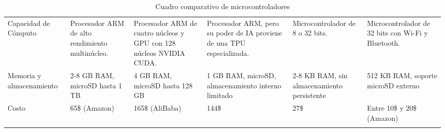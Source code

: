 {\begin{longtable}[c]{p{2.2cm} p{2.4cm} p{2.4cm} p{2.4cm} p{2.4cm} p{2.4cm}}
    Capacidad de Cómputo                                                                                                                                   &
    Procesador ARM de alto rendimiento multinúcleo.                                                                                                        &
    Procesador ARM de cuatro núcleos y GPU con 128 núcleos NVIDIA CUDA.                                                                                    &
    Procesador ARM, pero su poder de IA proviene de una TPU especializada.                                                                                 &
    Microcontrolador de 8 o 32 bits.                                                                                                                       &
    Microcontrolador de 32 bits con Wi-Fi y Bluetooth.                                                                                                        \\
 
    \addlinespace
    Memoria y almacenamiento                                                                                                                            &
    2-8 GB RAM, microSD hasta 1 TB                                &
    4 GB RAM, microSD hasta 128 GB                                                                 &
    1 GB RAM, microSD, almacenamiento interno limitado                                                                            &
    2-8 KB RAM, sin almacenamiento persistente                                                                                               &
    512 KB RAM, soporte microSD externo                                                                \\
    \addlinespace
    Costo                                                                                                                                                  &
     65\$ (Amazon)                                                                                                                         &
     165\$ (AliBaba)                                                                                                                &
     144\$                                                                                                                                 &
     27\$                                                                                                                                  &
     Entre 10\$ y 20\$ (Amazon)  
                                                                                                              \\
                                                                                                               \hline
    \caption{Cuadro comparativo de microcontroladores}
    \label{tab:cuadro_comparativo_microcontroladores}
  \end{longtable}
}
